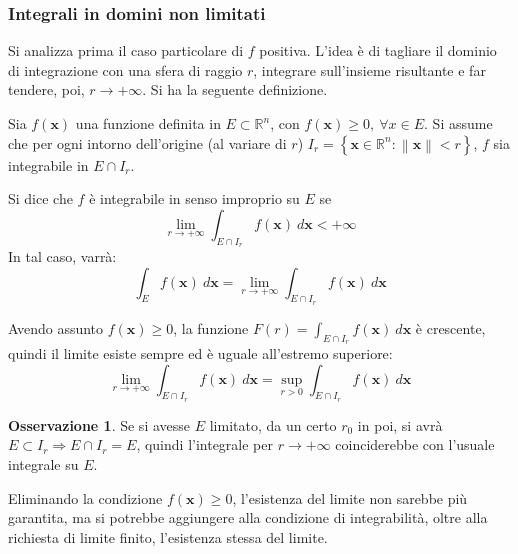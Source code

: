 \documentclass[10pt, a4paper]{scrartcl}
\theoremstyle{definition}
\numberwithin{esempio}{section}
\theoremstyle{definition}
\newtheorem{obs}{Osservazione}
\numberwithin{obs}{section}
\numberwithin{nota}{section}
\numberwithin{equation}{subsection}
\begin{document}
\subsubsection{Integrali in domini non limitati}
Si analizza prima il caso particolare di $f$ positiva. 
L'idea \`e di tagliare il dominio di integrazione con una sfera di raggio $r$, integrare sull'insieme risultante e far tendere, poi, $r\to +\infty$. Si ha la seguente definizione.
\begin{definizione}
	{}{}
	Sia $f(\mathbf{x} )$ una funzione definita in $E \subset \mathbb{R}^n$, con $f(\mathbf{x} ) \ge 0, \ \forall x \in E$.
	Si assume che per ogni intorno dell'origine (al variare di $r$) $ I_r = \left\{ \mathbf{x}  \in \mathbb{R}^n : \left\lVert \mathbf{x}  \right\rVert < r\right\} $, $f$ sia integrabile in $E \cap I_r$.

	Si dice che $f$ \`e integrabile in senso improprio su $E$ se
	\[
	\lim_{r \to +\infty} \int_{E\cap I_r} f(\mathbf{x} ) \ d\mathbf{x}  < +\infty
	\] 
	In tal caso, varr\`a:
	\begin{equation}
		\int_{E}  f(\mathbf{x} ) \ d\mathbf{x} =  \lim_{r \to +\infty} \int_{E\cap I_r} f(\mathbf{x} ) \ d\mathbf{x} 
	\end{equation}
\end{definizione}
\noindent Avendo assunto $f(\mathbf{x} )\ge 0$, la funzione $F(r) = \int_{E\cap I_r} f(\mathbf{x} ) \ d\mathbf{x} $ \`e crescente, quindi il limite esiste sempre ed \`e uguale all'estremo superiore:
\[
\lim_{r \to +\infty} \int_{E \cap I_r} f(\mathbf{x} ) \ d\mathbf{x} = \sup_{r > 0} \int_{E\cap I_r} f(\mathbf{x} ) \ d\mathbf{x} 
\] 
\begin{obs}
	Se si avesse $E$ limitato, da un certo $r_0$ in poi, si avr\`a $E \subset  I_r\Rightarrow E\cap I_r = E$, quindi l'integrale per $r\to +\infty$ coinciderebbe con l'usuale integrale su $E$.
\end{obs}
\noindent Eliminando la condizione $f(\mathbf{x} )\ge 0$, l'esistenza del limite non sarebbe pi\`u garantita, ma si potrebbe aggiungere alla condizione di integrabilit\`a, oltre alla richiesta di limite finito, l'esistenza stessa del limite.
\end{document}
